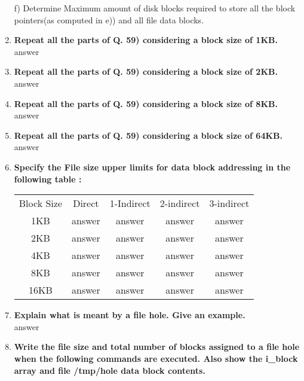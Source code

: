 \documentclass[a4paper,12pt]{article}
\begin{document}
\begin{flushleft}
\begin{enumerate}
f) Determine Maximum amount of disk blocks required to store all the block pointers(as computed in e)) and all file data blocks.\\
\item \textbf{ Repeat all the parts of Q. 59) considering a block size of 1KB.}\\
{\color{red}answer}\\
\item \textbf{ Repeat all the parts of Q. 59) considering a block size of 2KB.}\\
{\color{red}answer}\\
\item \textbf{ Repeat all the parts of Q. 59) considering a block size of 8KB.}\\
{\color{red}answer}\\
\item \textbf{ Repeat all the parts of Q. 59) considering a block size of 64KB.}\\
{\color{red}answer}\\
\item \textbf{ Specify the File size upper limits for data block addressing in the following table :}\\
\begin{tabular}{c c c c c}
\\ Block Size & Direct & 1-Indirect & 2-indirect & 3-indirect\\
1KB  & {\color{red}answer} & {\color{red}answer} & {\color{red}answer} & {\color{red}answer}\\
2KB  & {\color{red}answer} & {\color{red}answer} & {\color{red}answer} & {\color{red}answer}\\
4KB  & {\color{red}answer} & {\color{red}answer} & {\color{red}answer} & {\color{red}answer}\\
8KB  & {\color{red}answer} & {\color{red}answer} & {\color{red}answer} & {\color{red}answer}\\
16KB  & {\color{red}answer} & {\color{red}answer} & {\color{red}answer} & {\color{red}answer}\\
\end{tabular}
\item \textbf{ Explain what is meant by a file hole. Give an example.}\\
{\color{red}answer}\\
\item \textbf{ Write the file size and total number of blocks assigned to a file hole when the following commands are executed. Also show the i\_block array and file /tmp/hole data block contents.}\\

\end{enumerate}
\end{flushleft}
\end{document}
